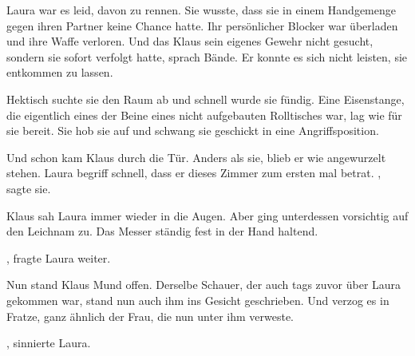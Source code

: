 \par

Laura war es leid, davon zu rennen. Sie wusste, dass sie in einem Handgemenge gegen ihren Partner keine Chance hatte. Ihr persönlicher Blocker war überladen und ihre Waffe verloren. Und das Klaus sein eigenes Gewehr nicht gesucht, sondern sie sofort verfolgt hatte, sprach Bände. Er konnte es sich nicht leisten, sie entkommen zu lassen.

\par

Hektisch suchte sie den Raum ab und schnell wurde sie fündig. Eine Eisenstange, die eigentlich eines der Beine eines nicht aufgebauten Rolltisches war, lag wie für sie bereit. Sie hob sie auf und schwang sie geschickt in eine Angriffsposition.

\par

Und schon kam Klaus durch die Tür. Anders als sie, blieb er wie angewurzelt stehen. Laura begriff schnell, dass er dieses Zimmer zum ersten mal betrat. , sagte sie. 

\par

Klaus sah Laura immer wieder in die Augen. Aber ging unterdessen vorsichtig auf den Leichnam zu. Das Messer ständig fest in der Hand haltend.

\par

, fragte Laura weiter. 

\par

Nun stand Klaus Mund offen. Derselbe Schauer, der auch tags zuvor über Laura gekommen war, stand nun auch ihm ins Gesicht geschrieben. Und verzog es in Fratze, ganz ähnlich der Frau, die nun unter ihm verweste.

\par

, sinnierte Laura. 

